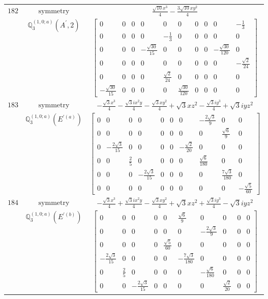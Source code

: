 \documentclass[fleqn,8pt,landscape]{jsarticle}
\begin{document}
\begin{longtable}{ccc}
$ 182 $ & $ \text{symmetry} $ & $ \frac{\sqrt{10} x^{3}}{4} - \frac{3 \sqrt{10} x y^{2}}{4} $ \\
$  $ & $ \mathbb{Q}_{3}^{(1,0;a)}(A^{\prime},2) $ & $ \begin{bmatrix} 0 & 0 & 0 & 0 & 0 & 0 & 0 & 0 & 0 & - \frac{1}{3} \\ 0 & 0 & 0 & 0 & - \frac{1}{3} & 0 & 0 & 0 & 0 & 0 \\ 0 & 0 & 0 & - \frac{\sqrt{30}}{15} & 0 & 0 & 0 & 0 & - \frac{\sqrt{30}}{120} & 0 \\ 0 & 0 & 0 & 0 & 0 & 0 & 0 & 0 & 0 & - \frac{\sqrt{2}}{24} \\ 0 & 0 & 0 & 0 & \frac{\sqrt{2}}{24} & 0 & 0 & 0 & 0 & 0 \\ - \frac{\sqrt{30}}{15} & 0 & 0 & 0 & 0 & \frac{\sqrt{30}}{120} & 0 & 0 & 0 & 0 \end{bmatrix} $ \\ \hline
$ 183 $ & $ \text{symmetry} $ & $ - \frac{\sqrt{3} x^{3}}{4} - \frac{\sqrt{3} i x^{2} y}{4} - \frac{\sqrt{3} x y^{2}}{4} + \sqrt{3} x z^{2} - \frac{\sqrt{3} i y^{3}}{4} + \sqrt{3} i y z^{2} $ \\
$  $ & $ \mathbb{Q}_{3}^{(1,0;a)}(E^{\prime(a)}) $ & $ \begin{bmatrix} 0 & 0 & 0 & 0 & 0 & 0 & 0 & - \frac{2 \sqrt{3}}{9} & 0 & 0 \\ 0 & 0 & 0 & 0 & 0 & 0 & 0 & 0 & \frac{\sqrt{6}}{9} & 0 \\ 0 & - \frac{2 \sqrt{3}}{15} & 0 & 0 & 0 & 0 & - \frac{\sqrt{2}}{20} & 0 & 0 & 0 \\ 0 & 0 & \frac{2}{5} & 0 & 0 & 0 & 0 & \frac{\sqrt{6}}{180} & 0 & 0 \\ 0 & 0 & 0 & - \frac{2 \sqrt{3}}{15} & 0 & 0 & 0 & 0 & \frac{7 \sqrt{3}}{180} & 0 \\ 0 & 0 & 0 & 0 & 0 & 0 & 0 & 0 & 0 & - \frac{\sqrt{5}}{60} \end{bmatrix} $ \\ \hline
$ 184 $ & $ \text{symmetry} $ & $ - \frac{\sqrt{3} x^{3}}{4} + \frac{\sqrt{3} i x^{2} y}{4} - \frac{\sqrt{3} x y^{2}}{4} + \sqrt{3} x z^{2} + \frac{\sqrt{3} i y^{3}}{4} - \sqrt{3} i y z^{2} $ \\
$  $ & $ \mathbb{Q}_{3}^{(1,0;a)}(E^{\prime(b)}) $ & $ \begin{bmatrix} 0 & 0 & 0 & 0 & 0 & \frac{\sqrt{6}}{9} & 0 & 0 & 0 & 0 \\ 0 & 0 & 0 & 0 & 0 & 0 & - \frac{2 \sqrt{3}}{9} & 0 & 0 & 0 \\ 0 & 0 & 0 & 0 & \frac{\sqrt{5}}{60} & 0 & 0 & 0 & 0 & 0 \\ - \frac{2 \sqrt{3}}{15} & 0 & 0 & 0 & 0 & - \frac{7 \sqrt{3}}{180} & 0 & 0 & 0 & 0 \\ 0 & \frac{2}{5} & 0 & 0 & 0 & 0 & - \frac{\sqrt{6}}{180} & 0 & 0 & 0 \\ 0 & 0 & - \frac{2 \sqrt{3}}{15} & 0 & 0 & 0 & 0 & \frac{\sqrt{2}}{20} & 0 & 0 \end{bmatrix} $ \\ \hline

\end{longtable}
\end{document}
